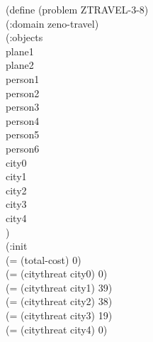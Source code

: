 \documentclass[a4paper,10pt]{article}
\begin{document}
(define (problem ZTRAVEL-3-8)\\
(:domain zeno-travel)\\
(:objects\\
	plane1\\
	plane2\\
	person1\\
	person2\\
	person3\\
	person4\\
	person5\\
	person6\\
	city0\\
	city1\\
	city2\\
	city3\\
	city4\\
	)\\
(:init\\
	(= (total-cost) 0)\\
	(= (citythreat city0) 0)\\
	(= (citythreat city1) 39)\\
	(= (citythreat city2) 38)\\
	(= (citythreat city3) 19)\\
	(= (citythreat city4) 0)\\
\end{document}
